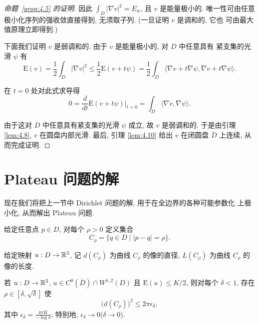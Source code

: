\begin{proof}[命题~\ref{prop:4.5} 的证明]
因此 $\int_D|\nabla v|^2=E_w$, 且 $v$ 是能量极小的. 唯一性可由任意
极小化序列的强收敛直接得到, 无须取子列. (一旦证明 $v$ 是调和的, 它也
可由最大值原理立即得到.)

下面我们证明 $v$ 是弱调和的. 由于 $v$ 是能量极小的, 对 $D$ 中任意具有
紧支集的光滑 $\psi$ 有
\begin{equation*}
\mathrm{E}(v)=\frac12\int_D|\nabla v|^2
 \leq\frac12\mathrm{E}(v+t\psi)
 =\frac12\int_D\langle\nabla v+t\nabla\psi,\nabla v+t\nabla\psi\rangle.
\end{equation*}

在 $t=0$ 处对此式求导得
\begin{equation}
0=\frac{d}{dt}\mathrm{E}(v+t\psi)\Big|_{t=0}
 =\int_D\langle\nabla v,\nabla\psi\rangle.
\label{eq:4.22}
\end{equation}

由于这对 $D$ 中任意具有紧支集的光滑 $\psi$ 成立, 故 $v$ 是弱调和的.
于是由引理 \ref{lem:4.8}, $v$ 在圆盘内部光滑. 最后, 引理 \ref{lem:4.10}
给出 $v$ 在闭圆盘 $\overline{D}$ 上连续, 从而完成证明.
\end{proof}

\section{Plateau 问题的解}
\label{sec:4.3}

现在我们将把上一节中 Dirichlet 问题的解, 用于在全边界的各种可能参数化
上极小化, 从而解出 Plateau 问题.

给定任意点 $p\in D$, 对每个 $\rho>0$ 定义集合
\begin{equation*}
C_\rho=\bigl\{q\in D\mid|p-q|=\rho\bigr\}.
\end{equation*}

给定映射 $u:D\to\mathbb{R}^3$, 记 $d(C_\rho)$ 为曲线 $C_\rho$ 的像的直径,
$L(C_\rho)$ 为曲线 $C_\rho$ 的像的长度.

\begin{lemma}
\label{lem:4.11}
若 $u:D\to\mathbb{R}^3$, $u\in C^0(\overline{D})\cap W^{1,2}(D)$ 且
$\mathrm{E}(u)\leq K/2$, 则对每个 $\delta<1$, 存在
$\rho\in[\delta,\sqrt{\delta}]$ 使
\begin{equation}
\bigl(d(C_\rho)\bigr)^2\leq 2\pi\epsilon_\delta,
\label{eq:4.23}
\end{equation}
其中 $\epsilon_\delta=\frac{4\pi K}{-\log\delta}$; 特别地,
$\epsilon_\delta\to0$($\delta\to0$).
\end{lemma}

